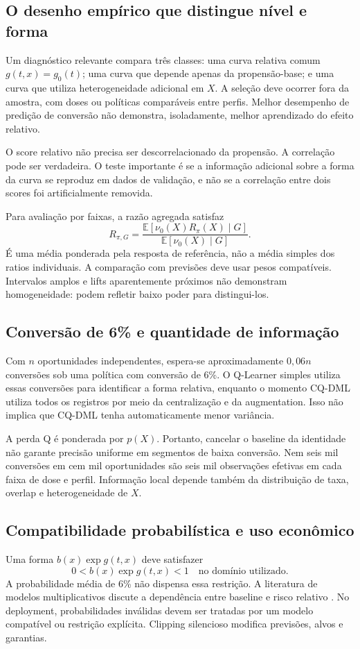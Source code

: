 \documentclass[11pt,a4paper]{article}
\newcommand{\E}{\mathbb E}
\begin{document}
\subsection{O desenho empírico que distingue nível e forma}
Um diagnóstico relevante compara três classes: uma curva relativa comum $g(t,x)=g_0(t)$; uma curva que depende apenas da propensão-base; e uma curva que utiliza heterogeneidade adicional em $X$. A seleção deve ocorrer fora da amostra, com doses ou políticas comparáveis entre perfis. Melhor desempenho de predição de conversão não demonstra, isoladamente, melhor aprendizado do efeito relativo.

O score relativo não precisa ser descorrelacionado da propensão. A correlação pode ser verdadeira. O teste importante é se a informação adicional sobre a forma da curva se reproduz em dados de validação, e não se a correlação entre dois scores foi artificialmente removida.

Para avaliação por faixas, a razão agregada satisfaz
\begin{equation}
R_{\pi,G}=\frac{\E[\nu_0(X)R_\pi(X)\mid G]}{\E[\nu_0(X)\mid G]}.
\label{eq:groupweight}
\end{equation}
É uma média ponderada pela resposta de referência, não a média simples dos ratios individuais. A comparação com previsões deve usar pesos compatíveis. Intervalos amplos e lifts aparentemente próximos não demonstram homogeneidade: podem refletir baixo poder para distingui-los.

\subsection{Conversão de 6\% e quantidade de informação}
Com $n$ oportunidades independentes, espera-se aproximadamente $0{,}06n$ conversões sob uma política com conversão de 6\%. O Q-Learner simples utiliza essas conversões para identificar a forma relativa, enquanto o momento CQ-DML utiliza todos os registros por meio da centralização e da augmentation. Isso não implica que CQ-DML tenha automaticamente menor variância.

A perda Q é ponderada por $p(X)$. Portanto, cancelar o baseline da identidade não garante precisão uniforme em segmentos de baixa conversão. Nem seis mil conversões em cem mil oportunidades são seis mil observações efetivas em cada faixa de dose e perfil. Informação local depende também da distribuição de taxa, overlap e heterogeneidade de $X$.

\subsection{Compatibilidade probabilística e uso econômico}
Uma forma $b(x)\exp g(t,x)$ deve satisfazer
\begin{equation}
0<b(x)\exp g(t,x)<1\quad\text{no domínio utilizado}.
\label{eq:constraint}
\end{equation}
A probabilidade média de 6\% não dispensa essa restrição. A literatura de modelos multiplicativos discute a dependência entre baseline e risco relativo \cite{yin2022}. No deployment, probabilidades inválidas devem ser tratadas por um modelo compatível ou restrição explícita. Clipping silencioso modifica previsões, alvos e garantias.
\end{document}
